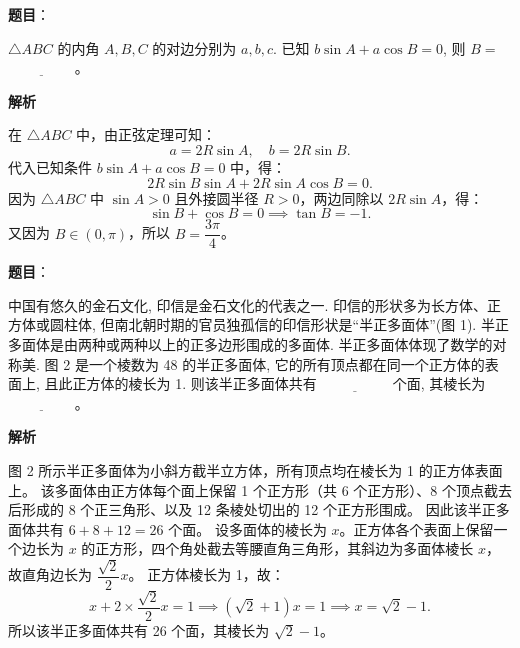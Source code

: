 \begin{answer}

\textbf{题目}：

$\triangle ABC$ 的内角 $A, B, C$ 的对边分别为 $a, b, c$. 已知 $b\sin A + a\cos B = 0$, 则 $B =$ $\underline{\hspace{2cm}}$。

\textbf{解析}

在 $\triangle ABC$ 中，由正弦定理可知：
\nopagebreak[4]
\[a = 2R\sin A, \quad b = 2R\sin B.\]
代入已知条件 $b\sin A + a\cos B = 0$ 中，得：
\nopagebreak[4]
\[2R\sin B\sin A + 2R\sin A\cos B = 0.\]
因为 $\triangle ABC$ 中 $\sin A > 0$ 且外接圆半径 $R > 0$，两边同除以 $2R\sin A$，得：
\nopagebreak[4]
\[\sin B + \cos B = 0 \implies \tan B = -1.\]
又因为 $B \in (0, \pi)$，所以 $B = \dfrac{3\pi}{4}$。


\end{answer}
\begin{answer}

\textbf{题目}：

中国有悠久的金石文化, 印信是金石文化的代表之一. 印信的形状多为长方体、正方体或圆柱体, 但南北朝时期的官员独孤信的印信形状是“半正多面体”(图 1). 半正多面体是由两种或两种以上的正多边形围成的多面体. 半正多面体体现了数学的对称美. 图 2 是一个棱数为 48 的半正多面体, 它的所有顶点都在同一个正方体的表面上, 且此正方体的棱长为 1. 则该半正多面体共有 $\underline{\hspace{2cm}}$ 个面, 其棱长为 $\underline{\hspace{2cm}}$。
\nopagebreak[4]
\begin{center}\end{center}
\nopagebreak[4]
\textbf{解析}

图 2 所示半正多面体为小斜方截半立方体，所有顶点均在棱长为 1 的正方体表面上。
该多面体由正方体每个面上保留 1 个正方形（共 6 个正方形）、8 个顶点截去后形成的 8 个正三角形、以及 12 条棱处切出的 12 个正方形围成。
因此该半正多面体共有 $6 + 8 + 12 = 26$ 个面。
设多面体的棱长为 $x$。正方体各个表面上保留一个边长为 $x$ 的正方形，四个角处截去等腰直角三角形，其斜边为多面体棱长 $x$，故直角边长为 $\dfrac{\sqrt{2}}{2}x$。
正方体棱长为 1，故：
\nopagebreak[4]
\[x + 2 \times \frac{\sqrt{2}}{2}x = 1 \implies (\sqrt{2} + 1)x = 1 \implies x = \sqrt{2} - 1.\]
所以该半正多面体共有 26 个面，其棱长为 $\sqrt{2} - 1$。


\par\medskip

\end{answer}

